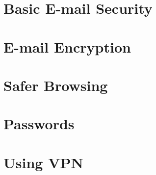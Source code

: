 \documentclass[oribibl,a4paper]{book}
\begin{document}
\chapter{Basic E-mail Security}

\clearpage

\clearpage

\clearpage
\graphicspath{{./chapter_06_email_encryption/}}
\chapter{E-mail Encryption}

\clearpage

\clearpage

\clearpage

\clearpage

\clearpage

\clearpage

\clearpage

\clearpage
\graphicspath{{./chapter_07_safer_browsing/}}
\chapter{Safer Browsing}

\clearpage

\clearpage

\clearpage

\clearpage

\clearpage

\clearpage

\clearpage
\graphicspath{{./chapter_08_passwords/}}
\chapter{Passwords}

\clearpage

\clearpage

\clearpage
\graphicspath{{./chapter_09_using_vpn/}}
\chapter{Using VPN}

\clearpage

\clearpage

\clearpage

\clearpage

\clearpage
\graphicspath{{./chapter_10_disk_encryption/}}
\end{document}
